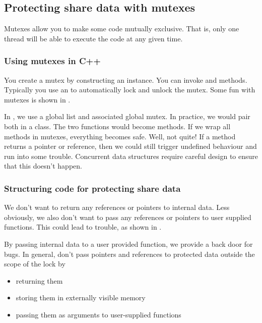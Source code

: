 \subsection{Protecting share data with mutexes}
Mutexes allow you to make some code mutually exclusive. That is, only one thread will be able to execute the code at any given time. 

\subsubsection{Using mutexes in C++}
You create a mutex by constructing an  instance. You can invoke  and  methods. Typically you use an  to automatically lock and unlock the mutex. Some fun with mutexes is shown in .


In , we use a global list and associated global mutex. In practice, we would pair both in a class. The two functions would become methods. If we wrap all methods in mutexes, everything becomes safe. Well, not quite! If a method returns a pointer or reference, then we could still trigger undefined behaviour and run into some trouble. Concurrent data structures require careful design to ensure that this doesn't happen.

\subsubsection{Structuring code for protecting share data}
We don't want to return any references or pointers to internal data. Less obviously, we also don't want to pass any references or pointers to user supplied functions. This could lead to trouble, as shown in .


By passing internal data to a user provided function, we provide a back door for bugs. In general, don't pass pointers and references to protected data outside the scope of the lock by
\begin{itemize}
  \item returning them
  \item storing them in externally visible memory
  \item passing them as arguments to user-supplied functions
\end{itemize}

